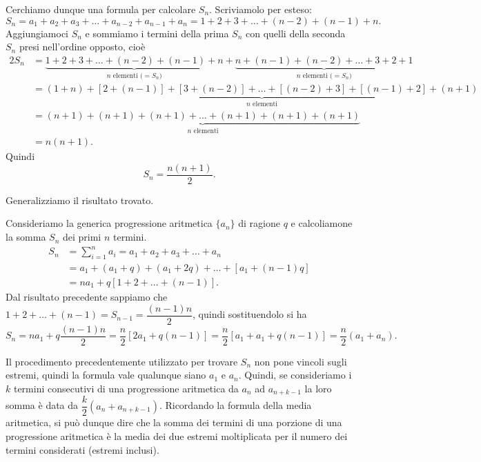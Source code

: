 Cerchiamo dunque una formula per calcolare $S_n$. Scriviamolo per esteso:
\[S_n = a_1 + a_2 + a_3 + \ldots + a_{n-2} + a_{n-1} + a_n = 1 + 2 + 3 + \ldots + (n-2) + (n-1) + n.\]
Aggiungiamoci $S_n$ e sommiamo i termini della prima $S_n$ con quelli della seconda $S_n$ presi nell'ordine opposto, cioè
\begin{align*}
2S_n &= \underbrace{1 + 2 + 3 + \ldots + (n-2) + (n-1) + n}_{n\text{ elementi (}=S_n\text{)}} + \underbrace{n + (n-1) + (n-2) + \ldots + 3 + 2 + 1}_{n\text{ elementi (}=S_n\text{)}}\\
&=\underbrace{(1 + n) + [2 + (n-1)] + [3 + (n-2)] + \ldots + [(n-2) + 3] + [(n-1) + 2] + (n + 1)}_{n\text{ elementi}}\\
&=\underbrace{(n + 1) + (n + 1) + (n + 1) + \ldots + (n + 1) + (n + 1) + (n + 1)}_{n\text{ elementi}}\\
&=n(n+1).
\end{align*}
Quindi
\[S_n = \frac{n(n+1)}{2}.\]

Generalizziamo il risultato trovato.

Consideriamo la generica progressione aritmetica $\{a_n\}$ di ragione $q$ e calcoliamone la somma $S_n$ dei primi $n$ termini.
\begin{align*}
S_n &= \sum_{i=1}^{n}a_i=a_1+a_2+a_3+\ldots+a_n\\
&=a_1+(a_1+q)+(a_1+2q)+\ldots+[a_1+(n-1)q]\\
&=na_1+q[1+2+\ldots+(n-1)].
\end{align*}
Dal risultato precedente sappiamo che $1+2+\ldots+(n-1)=S_{n-1}=\dfrac{(n-1)n}{2}$, quindi sostituendolo si ha
\[S_n=na_1+q\frac{(n-1)n}{2}=\frac{n}{2}[2a_1+q(n-1)]=\frac{n}{2}[a_1+a_1+q(n-1)]=\frac{n}{2}(a_1+a_n).\]

Il procedimento precedentemente utilizzato per trovare $S_n$ non pone vincoli sugli estremi, quindi la formula vale qualunque siano $a_1$ e $a_n$. Quindi, se consideriamo i $k$ termini consecutivi di una progressione aritmetica da $a_n$ ad $a_{n+k-1}$ la loro somma è data da $\dfrac{k}{2}(a_n+a_{n+k-1})$. Ricordando la formula della media aritmetica, si può dunque dire che la somma dei termini di una porzione di una progressione aritmetica è la media dei due estremi moltiplicata per il numero dei termini considerati (estremi inclusi).

\vspazio\ovalbox{\risolvii \ref{ese:8a_progr.1}, \ref{ese:8a_progr.2}, \ref{ese:8a_progr.3}, \ref{ese:8a_progr.4}, \ref{ese:8a_progr.5}, \ref{ese:8a_progr.6}, \ref{ese:8a_progr.7}, \ref{ese:8a_progr.8}, \ref{ese:8a_progr.8}, \ref{ese:8a_progr.9}, \ref{ese:8a_progr.10}, \ref{ese:8a_progr.11}, \ref{ese:8a_progr.12},}

